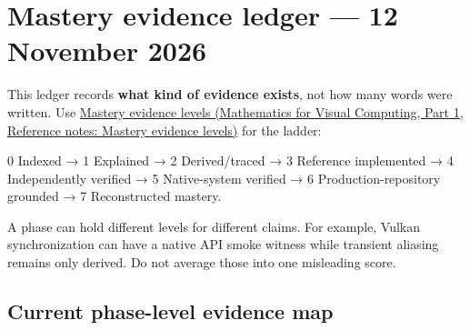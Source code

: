 \hypertarget{appendix-2358b21a702d}{}\label{referencestart:appendix-2358b21a702d}
\section{Mastery evidence ledger --- 12 November 2026}\label{appendix-2358b21a702d-mastery-evidence-ledger-12-november-2026}

\hypertarget{appendix-2358b21a702d-mastery-evidence-ledger-12-november-2026}{}

This ledger records \textbf{what kind of evidence exists}, not how many words were written. Use \href{../02-Mathematics-for-Visual-Computing-P01/main.pdf\#nameddest=appendix-2a2e5bd7143a}{Mastery evidence levels (Mathematics for Visual Computing, Part 1, Reference notes: Mastery evidence levels)} for the ladder:

0 Indexed → 1 Explained → 2 Derived/traced → 3 Reference implemented → 4 Independently verified → 5 Native-system verified → 6 Production-repository grounded → 7 Reconstructed mastery.

A phase can hold different levels for different claims. For example, Vulkan synchronization can have a native API smoke witness while transient aliasing remains only derived. Do not average those into one misleading score.

\subsection{Current phase-level evidence map}\label{appendix-2358b21a702d-current-phase-level-evidence-map}

\hypertarget{appendix-2358b21a702d-current-phase-level-evidence-map}{}

